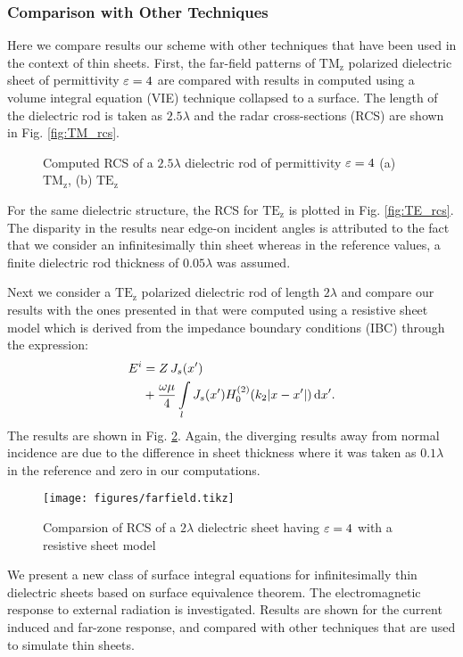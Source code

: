 \subsubsection{Comparison with Other Techniques}
%
Here we compare results our scheme with other techniques that have been used in the context of thin sheets. First, the far-field patterns of $\mathrm{TM_z}$ polarized dielectric sheet of permittivity $\varepsilon = 4$ are compared with results in \cite{Richmond1965} computed using a volume integral equation (VIE) technique collapsed to a surface. The length of the dielectric rod is taken as $2.5 \lambda$ and the radar cross-sections (RCS) are shown in Fig. \ref{fig:TM_rcs}.
%
\begin{figure}[!htbp]
  \centering
  \caption{Computed RCS of a $2.5 \lambda$ dielectric rod of permittivity $\varepsilon=4$ (a) $\mathrm{TM_z}$, (b) $\mathrm{TE_z}$}
  \label{fig:RCS_richmodn}
\end{figure}
%
For the same dielectric structure, the RCS for $\mathrm{TE_z}$ is plotted in Fig. \ref{fig:TE_rcs}. The disparity in the results near edge-on incident angles is attributed to the fact that we consider an infinitesimally thin sheet whereas in the reference values, a finite dielectric rod thickness of $0.05 \lambda$ was assumed.

Next we consider a $\mathrm{TE_z}$ polarized dielectric rod of length $2 \lambda$ and compare our results with the ones presented in \cite{Senior_1987} that were computed using a resistive sheet model which is derived from the impedance boundary conditions (IBC) through the expression:
%
\begin{equation}
  \begin{split}
    E^i &= Z \, J_s(x') \\
    & + \frac{\omega \mu}{4}  \int\limits_{l} J_s(x')  H_0^{(2)}(k_2 |x - x'|) \mathop{}\!\mathrm{d}{x'}.
  \end{split}
  \label{eq:IBC_senior}
\end{equation}
%
The results are shown in Fig. \ref{fig:senior_rcs}. Again, the diverging results away from normal incidence are due to the difference in sheet thickness where it was taken as $0.1 \lambda$ in the reference and zero in our computations.
%
\begin{figure}
  \centering
  \texttt{[image: figures/farfield.tikz]}
  \caption{Comparsion of RCS of a $2 \lambda$ dielectric sheet having $\varepsilon=4$ with a resistive sheet model}
  \label{fig:senior_rcs}
\end{figure}
%
%
%
We present a new class of surface integral equations for infinitesimally thin dielectric sheets based on surface equivalence theorem. The electromagnetic response to external radiation is investigated. Results are shown for the current induced and far-zone response, and compared with other techniques that are used to simulate thin sheets.
% 
% 
%
% 
